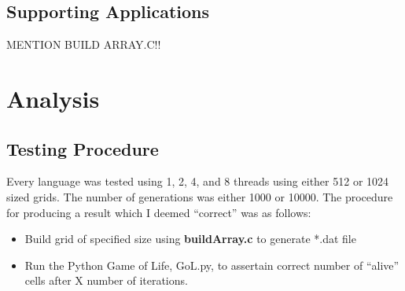\documentclass[11pt]{article} %
\begin{document}
\subsection{Supporting Applications}
MENTION BUILD ARRAY.C!!

\section{Analysis}
\subsection{Testing Procedure}
Every language was tested using 1, 2, 4, and 8 threads using either 512 or 1024 sized grids. The number of generations was either 1000 or 10000. The procedure for producing a result which I deemed ``correct'' was as follows:
\begin{itemize}
\item Build grid of specified size using {\bf buildArray.c} to generate *.dat file
\item Run the Python Game of Life, GoL.py, to assertain correct number of ``alive'' cells after X number of iterations.
\end{itemize}



%
%
\end{document}
